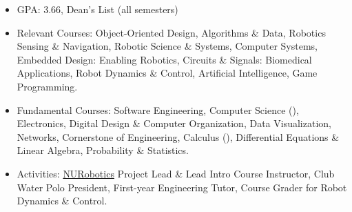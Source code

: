 \documentclass[10pt,a4paper,ragged2e,withhyper]{altacv}
\newcommand{\rom}[1]{\uppercase\expandafter{\romannumeral #1\relax}}
\begin{document}
\tagline{}
\makecvheader


\vspace{-2em}
\begin{paracol}{2}

    \begin{itemize}
        \item GPA: 3.66, Dean's List (all semesters)
        \item Relevant Courses: Object-Oriented Design, Algorithms \& Data, Robotics Sensing \& Navigation, Robotic Science \& Systems, Computer Systems, Embedded Design: Enabling Robotics, Circuits \& Signals: Biomedical Applications, Robot Dynamics \& Control, Artificial Intelligence, Game Programming.
        \item Fundamental Courses: Software Engineering, Computer Science (\rom{2}), Electronics, Digital Design \& Computer Organization, Data Visualization, Networks, Cornerstone of Engineering, Calculus (\rom{3}), Differential Equations \& Linear Algebra, Probability \& Statistics.
        \item Activities: \href{https://web.northeastern.edu/nurobotics/}{NURobotics} Project Lead \& Lead Intro Course Instructor, Club Water Polo President, First-year Engineering Tutor, Course Grader for Robot Dynamics \& Control.
    \end{itemize}


\end{paracol}
\end{document}
